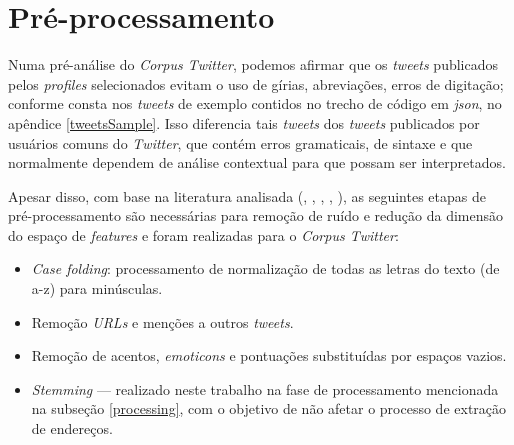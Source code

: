 \documentclass[
	12pt,				%
	oneside,			%
	a4paper,			%
	english,			%
	brazil				%
	]{abntex2ppgsi}
\begin{document}
\section{Pré-processamento}
\label{preprocessing}

Numa pré-análise do \textit{Corpus Twitter}, podemos afirmar que os \textit{tweets} publicados pelos \textit{profiles} selecionados evitam o uso de gírias, abreviações, erros de digitação; conforme consta nos \textit{tweets} de exemplo contidos no trecho de código em \textit{json}, no apêndice \ref{tweetsSample}.  Isso diferencia tais \textit{tweets} dos \textit{tweets} publicados por usuários comuns do \textit{Twitter}, que contém erros gramaticais, de sintaxe e que normalmente dependem de análise contextual para que possam ser interpretados.

Apesar disso, com base na literatura analisada (\cite{Steiger2015Census}, \cite{Middleton2014}, \cite{Kobdani2010}, \cite{Setiawan2017},  \cite{Zagal2016}), as seguintes etapas de pré-processamento são necessárias para remoção de ruído e redução da dimensão do espaço de \textit{features} e foram realizadas para o \textit{Corpus Twitter}:

\begin{itemize}
\item \textit{Case folding}: processamento de normalização de todas as letras do texto (de a-z) para minúsculas.
\item Remoção  \textit{URLs} e menções a outros \textit{tweets}.
\item Remoção de acentos, \textit{emoticons} e pontuações substituídas por espaços vazios.
\item \textit{Stemming} --- realizado neste trabalho na fase de processamento mencionada na subseção \ref{processing}, com o objetivo de não afetar o processo de extração de endereços. 
\end{itemize}
\end{document}
